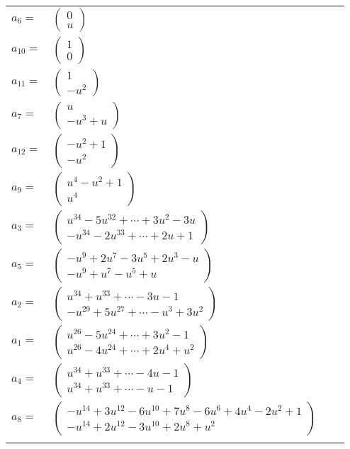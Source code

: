 \documentclass[1p]{elsarticle_modified}
\theoremstyle{definition}
\begin{document}
\begin{tabular}{m{7pt} m{180pt} m{7pt} m{180pt} }
\flushright $a_{6}=$&$\begin{pmatrix}0\\u\end{pmatrix}$ \\
\flushright $a_{10}=$&$\begin{pmatrix}1\\0\end{pmatrix}$ \\
\flushright $a_{11}=$&$\begin{pmatrix}1\\- u^2\end{pmatrix}$ \\
\flushright $a_{7}=$&$\begin{pmatrix}u\\- u^3+u\end{pmatrix}$ \\
\flushright $a_{12}=$&$\begin{pmatrix}- u^2+1\\- u^2\end{pmatrix}$ \\
\flushright $a_{9}=$&$\begin{pmatrix}u^4- u^2+1\\u^4\end{pmatrix}$ \\
\flushright $a_{3}=$&$\begin{pmatrix}u^{34}-5 u^{32}+\cdots+3 u^2-3 u\\- u^{34}-2 u^{33}+\cdots+2 u+1\end{pmatrix}$ \\
\flushright $a_{5}=$&$\begin{pmatrix}- u^9+2 u^7-3 u^5+2 u^3- u\\- u^9+u^7- u^5+u\end{pmatrix}$ \\
\flushright $a_{2}=$&$\begin{pmatrix}u^{34}+u^{33}+\cdots-3 u-1\\- u^{29}+5 u^{27}+\cdots- u^3+3 u^2\end{pmatrix}$ \\
\flushright $a_{1}=$&$\begin{pmatrix}u^{26}-5 u^{24}+\cdots+3 u^2-1\\u^{26}-4 u^{24}+\cdots+2 u^4+u^2\end{pmatrix}$ \\
\flushright $a_{4}=$&$\begin{pmatrix}u^{34}+u^{33}+\cdots-4 u-1\\u^{34}+u^{33}+\cdots- u-1\end{pmatrix}$ \\
\flushright $a_{8}=$&$\begin{pmatrix}- u^{14}+3 u^{12}-6 u^{10}+7 u^8-6 u^6+4 u^4-2 u^2+1\\- u^{14}+2 u^{12}-3 u^{10}+2 u^8+u^2\end{pmatrix}$\\&\end{tabular}
\end{document}
